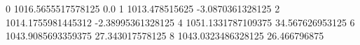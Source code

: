 0 1016.5655517578125 0.0
1 1013.478515625 -3.0870361328125
2 1014.1755981445312 -2.38995361328125
4 1051.1331787109375 34.567626953125
6 1043.9085693359375 27.343017578125
8 1043.0323486328125 26.466796875
